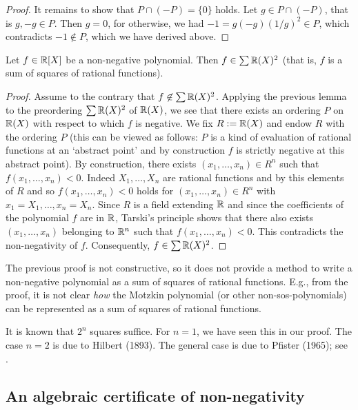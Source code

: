 \begin{proof}
	It remains to show that $P \cap (-P) = \{0\}$ holds. Let $g \in P \cap (-P)$, that is $g, - g \in P$. Then $g =0$, for otherwise, we had $-1 = g (-g) (1/g)^2 \in P$, which contradicts $-1 \not\in P$, which we have derived above. 
\end{proof}

\begin{theorem}[Artin 1927] Let $f \in \mathbb{R}[X]$ be a non-negative polynomial. Then $f \in \sum \mathbb{R}(X)^2$ (that is, $f$ is a sum of squares of rational functions). 
\end{theorem}
\begin{proof}
	Assume to the contrary that $f \not \in \sum \mathbb{R}(X)^2$. Applying the previous lemma to the preordering $\sum \mathbb{R}(X)^2$ of $\mathbb{R}(X)$, we see that there exists an ordering $P$ on $\mathbb{R}(X)$ with respect to which $f$ is negative. We fix $R := \mathbb{R}(X)$ and endow $R$ with the ordering $P$ (this can be viewed as follows: $P$ is a kind of evaluation of rational functions at an `abstract point' and by construction $f$ is strictly negative at this abstract point). By construction, there exists $(x_1,\ldots,x_n) \in R^n$ such that $f(x_1,\ldots,x_n) < 0$. Indeed $X_1,\ldots,X_n$ are rational functions and by this elements of $R$ and so $f(x_1,\ldots,x_n) < 0$ holds for $(x_1,\ldots,x_n) \in R^n$ with $x_1=X_1,\ldots,x_n=X_n$. Since $R$ is a field extending $\mathbb{R}$ and since the coefficients of the polynomial $f$ are in $\mathbb{R}$, Tarski's principle  shows that there also exists $(x_1,\ldots,x_n)$ belonging to $\mathbb{R}^n$ such that $f(x_1,\ldots,x_n) < 0$. This contradicts the non-negativity of $f$. Consequently, $f \in \sum \mathbb{R}(X)^2$. 
\end{proof}

\begin{remark}
The previous proof is not constructive, so it does not provide a method to write a non-negative polynomial as a sum of squares of rational functions. E.g., from the proof, it is not clear \emph{how} the Motzkin polynomial (or other non-sos-polynomials) can be represented as a sum of squares of rational functions. 
\end{remark}

\begin{remark}
	It is known that $2^n$ squares suffice. For $n=1$, we have seen this in our proof. The case $n=2$ is due to Hilbert (1893). The general case is due to Pfister (1965); see \cite{Bochnak:Coste:Roy:1998}. 
\end{remark}

\subsection{An algebraic certificate of non-negativity}


